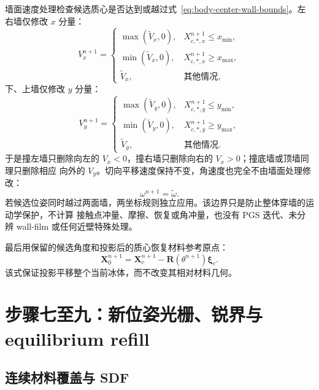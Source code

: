 \documentclass[UTF8,zihao=-4]{ctexart}
\newcommand{\vect}[1]{\boldsymbol{#1}}
\numberwithin{equation}{section}
\begin{document}
墙面速度处理检查候选质心是否达到或越过式~\eqref{eq:body-center-wall-bounds}。左右墙仅修改
$x$ 分量：
\begin{equation}
  V_x^{n+1}=
  \begin{cases}
    \max(\widetilde V_x,0),&X_{c,*,x}^{n+1}\le x_{\min},\\
    \min(\widetilde V_x,0),&X_{c,*,x}^{n+1}\ge x_{\max},\\
    \widetilde V_x,&\text{其他情况},
  \end{cases}
  \label{eq:wall-normal-x-clamp}
\end{equation}
下、上墙仅修改 $y$ 分量：
\begin{equation}
  V_y^{n+1}=
  \begin{cases}
    \max(\widetilde V_y,0),&X_{c,*,y}^{n+1}\le y_{\min},\\
    \min(\widetilde V_y,0),&X_{c,*,y}^{n+1}\ge y_{\max},\\
    \widetilde V_y,&\text{其他情况}.
  \end{cases}
  \label{eq:wall-normal-y-clamp}
\end{equation}
于是撞左墙只删除向左的 $V_x<0$，撞右墙只删除向右的 $V_x>0$；撞底墙或顶墙同理只删除相应
向外的 $V_y$。切向平移速度保持不变，角速度也完全不由墙面处理修改：
\begin{equation}
  \omega^{n+1}=\widetilde\omega.
\end{equation}
若候选位姿同时越过两面墙，两坐标规则独立应用。该边界只是防止整体穿墙的运动学保护，不计算
接触点冲量、摩擦、恢复或角冲量，也没有 PGS 迭代、未分辨 wall-film 或任何近壁特殊处理。

最后用保留的候选角度和投影后的质心恢复材料参考原点：
\begin{equation}
  \vect X_0^{n+1}=\vect X_c^{n+1}
  -\vect R(\theta^{n+1})\vect\xi_c.
\end{equation}
该式保证投影平移整个当前冰体，而不改变其相对材料几何。

\section{步骤七至九：新位姿光栅、锐界与 equilibrium refill}

\subsection{连续材料覆盖与 SDF}
\end{document}
